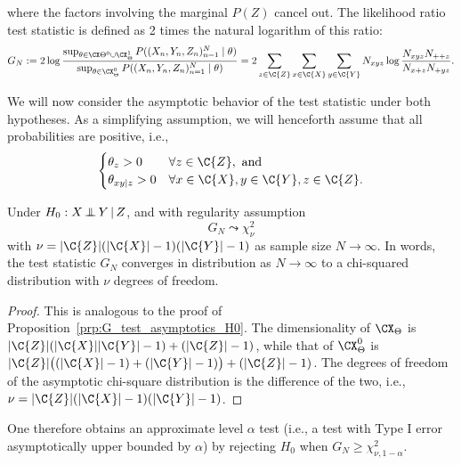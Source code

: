 where the factors involving the marginal $P(Z)$ cancel out.
The likelihood ratio test statistic is defined as 2 times the natural logarithm of this ratio:
\begin{equation}\label{eq:cond_G_test_statistic}
G_N := 2 \log \frac{\sup_{\theta\in\CX\Theta^0\cup\CX_\Theta^1} P((X_n,Y_n,Z_n)_{n=1}^N \mid \theta)}{\sup_{\theta\in\CX_\Theta^0} P((X_n,Y_n,Z_n)_{n=1}^N \mid \theta)} = 2 \sum_{z\in\C{Z}} \sum_{x\in\C{X}} \sum_{y\in\C{Y}} N_{xyz} \log \frac{N_{xyz} N_{+ + z}}{N_{x+ z} N_{+ y z}}.
\end{equation}

We will now consider the asymptotic behavior of the test statistic under both hypotheses.
As a simplifying assumption, we will henceforth assume that all probabilities are positive, i.e.,
\begin{equation}\label{eq:cond_G_test_regularity}
  \begin{cases}
    \theta_z > 0 & \forall z \in \C{Z}, \text{ and}\\
    \theta_{xy|z} > 0 & \forall x \in \C{X}, y\in \C{Y}, z\in \C{Z}.
  \end{cases}
\end{equation}
\begin{Prp}\label{prp:cond_G_test_asymptotics_H0}
Under $H_0 : X \operatorname*{\perp\mkern-11mu\perp} Y \operatorname*{|} Z$, and with regularity assumption 
$$G_N \leadsto \chi_\nu^2$$
with $\nu = |\C{Z}|(|\C{X}| - 1)(|\C{Y}| - 1)$ as sample size $N \to \infty$.
In words, the test statistic $G_N$ converges in distribution as $N \to \infty$ to a chi-squared distribution with $\nu$ degrees of freedom.
\end{Prp}
\begin{proof}
This is analogous to the proof of Proposition~\ref{prp:G_test_asymptotics_H0}.
The dimensionality of $\CX_\Theta$ is $|\C{Z}|(|\C{X}||\C{Y}| - 1) + (|\C{Z}|-1)$, while
that of $\CX_\Theta^0$ is $|\C{Z}|\big((|\C{X}|-1) + (|\C{Y}|-1)\big) + (|\C{Z}|-1)$. The degrees
of freedom of the asymptotic chi-square distribution is the difference of the two, i.e.,
$\nu = |\C{Z}|(|\C{X}| - 1)(|\C{Y}| - 1)$.
\end{proof}

One therefore obtains an approximate level $\alpha$ test (i.e., a test with Type I error asymptotically upper bounded by $\alpha$) 
by rejecting $H_0$ when $G_N \ge \chi_{\nu,1-\alpha}^2$.

